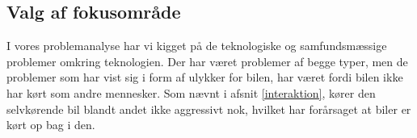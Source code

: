 \subsection{Valg af fokusområde}
I vores problemanalyse har vi kigget på de teknologiske og samfundsmæssige problemer omkring teknologien. Der har været problemer af begge typer, men de problemer som har vist sig i form af ulykker for bilen, har været fordi bilen ikke har kørt som andre mennesker. Som nævnt i afsnit \ref{interaktion}, kører den selvkørende bil blandt andet ikke aggressivt nok, hvilket har forårsaget at biler er kørt op bag i den\cite{VOX}.

